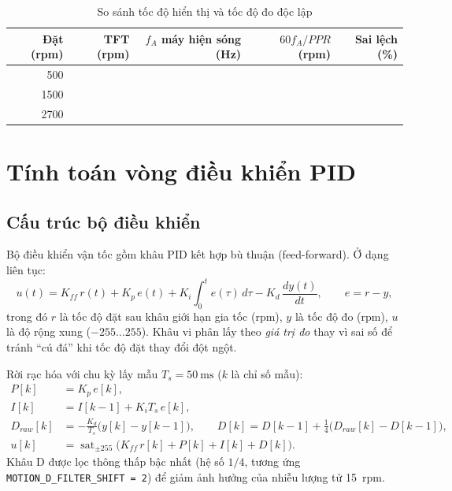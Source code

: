 \begin{table}[H]
\centering\small
\caption{So sánh tốc độ hiển thị và tốc độ đo độc lập}
\label{tab:verify}
\begin{tabular}{@{}rrrrr@{}}
\toprule
\textbf{Đặt (rpm)} & \textbf{TFT (rpm)} & \textbf{$f_A$ máy hiện sóng (Hz)} & \textbf{$60f_A/PPR$ (rpm)} & \textbf{Sai lệch (\%)}\\
\midrule
500 & \bosung{} & \bosung{} & \bosung{} & \bosung{}\\
1500 & \bosung{} & \bosung{} & \bosung{} & \bosung{}\\
2700 & \bosung{} & \bosung{} & \bosung{} & \bosung{}\\
\bottomrule
\end{tabular}
\end{table}

\section{Tính toán vòng điều khiển PID}
\label{sec:pid}

\subsection{Cấu trúc bộ điều khiển}
Bộ điều khiển vận tốc gồm khâu PID kết hợp bù thuận (feed-forward). Ở dạng liên tục:
\begin{equation}
  u(t) = K_{ff}\,r(t) + K_p\,e(t) + K_i\int_0^t e(\tau)\,d\tau - K_d\,\frac{dy(t)}{dt},\qquad e = r - y,
\end{equation}
trong đó $r$ là tốc độ đặt sau khâu giới hạn gia tốc (rpm), $y$ là tốc độ đo (rpm), $u$ là độ rộng xung ($-255\ldots255$). Khâu vi phân lấy theo \emph{giá trị đo} thay vì sai số để tránh ``cú đá'' khi tốc độ đặt thay đổi đột ngột.

Rời rạc hóa với chu kỳ lấy mẫu $T_s=\SI{50}{\milli\second}$ ($k$ là chỉ số mẫu):
\begin{align}
  P[k] &= K_p\,e[k],\\
  I[k] &= I[k-1] + K_i T_s\, e[k],\\
  D_{raw}[k] &= -\frac{K_d}{T_s}\big(y[k]-y[k-1]\big),\qquad
  D[k] = D[k-1] + \tfrac{1}{4}\big(D_{raw}[k]-D[k-1]\big),\\
  u[k] &= \operatorname{sat}_{\pm255}\big(K_{ff}\,r[k] + P[k] + I[k] + D[k]\big).
\end{align}
Khâu D được lọc thông thấp bậc nhất (hệ số $1/4$, tương ứng \texttt{MOTION\_D\_FILTER\_SHIFT = 2}) để giảm ảnh hưởng của nhiễu lượng tử \SI{15}{rpm}.

